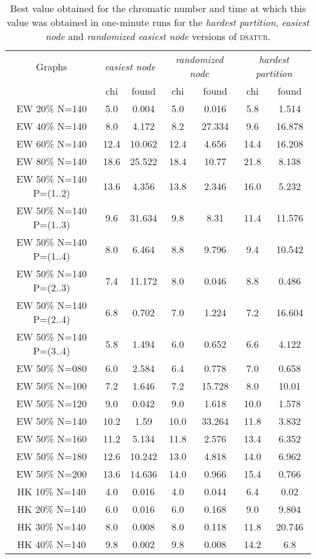 \begin{table}
\label{table:pdsatur:comp}
\centering

\begin{tabular}{|c|cc|cc|cc|}
\hline
\multicolumn{1}{|c|}{Graphs} & \multicolumn{2}{|c|}{\textit{easiest node}} & \multicolumn{2}{|c|}{\textit{randomized node}} & \multicolumn{2}{|c|}{\textit{hardest partition}}
\\
 & chi & found & chi & found & chi & found
\\
\hline
EW 20\% N=140 &  5.0 & 0.004 &  5.0 & 0.016 &  5.8 & 1.514
\\
EW 40\% N=140 &  8.0 & 4.172 &  8.2 & 27.334 &  9.6 & 16.878
\\
EW 60\% N=140 & 12.4 & 10.062 & 12.4 & 4.656 & 14.4 & 16.208
\\
EW 80\% N=140 & 18.6 & 25.522 & 18.4 & 10.77 & 21.8 & 8.138
\\
\hline
EW 50\% N=140 P=(1..2) & 13.6 & 4.356 & 13.8 & 2.346 & 16.0 & 5.232
\\
EW 50\% N=140 P=(1..3) &  9.6 & 31.634 &  9.8 & 8.31 & 11.4 & 11.576
\\
EW 50\% N=140 P=(1..4) &  8.0 & 6.464 &  8.8 & 9.796 &  9.4 & 10.542
\\
EW 50\% N=140 P=(2..3) &  7.4 & 11.172 &  8.0 & 0.046 &  8.8 & 0.486
\\
EW 50\% N=140 P=(2..4) &  6.8 & 0.702 &  7.0 & 1.224 &  7.2 & 16.604
\\
EW 50\% N=140 P=(3..4) &  5.8 & 1.494 &  6.0 & 0.652 &  6.6 & 4.122
\\
\hline
EW 50\% N=080 &  6.0 & 2.584 &  6.4 & 0.778 &  7.0 & 0.658
\\
EW 50\% N=100 &  7.2 & 1.646 &  7.2 & 15.728 &  8.0 & 10.01
\\
EW 50\% N=120 &  9.0 & 0.042 &  9.0 & 1.618 & 10.0 & 1.578
\\
EW 50\% N=140 & 10.2 & 1.59 & 10.0 & 33.264 & 11.8 & 3.832
\\
EW 50\% N=160 & 11.2 & 5.134 & 11.8 & 2.576 & 13.4 & 6.352
\\
EW 50\% N=180 & 12.6 & 10.242 & 13.0 & 4.818 & 14.0 & 6.962
\\
EW 50\% N=200 & 13.6 & 14.636 & 14.0 & 0.966 & 15.4 & 0.766
\\
\hline
HK 10\% N=140 &  4.0 & 0.016 &  4.0 & 0.044 &  6.4 & 0.02
\\
HK 20\% N=140 &  6.0 & 0.016 &  6.0 & 0.168 &  9.0 & 9.804
\\
HK 30\% N=140 &  8.0 & 0.008 &  8.0 & 0.118 & 11.8 & 20.746
\\
HK 40\% N=140 &  9.8 & 0.002 &  9.8 & 0.008 & 14.2 &  6.8
\\
\hline 
 \end{tabular}

\caption{Best value obtained for the chromatic number and time at which this value was obtained in one-minute runs for the \textit{hardest partition}, \textit{easiest node} and \textit{randomized easiest node} versions of \textsc{dsatur}.}

\end{table}